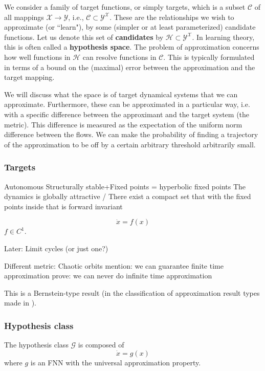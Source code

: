 \documentclass{article}
\theoremstyle{definition}
\theoremstyle{remark}
\begin{document}
We consider a family of target functions, or simply targets, which is a subset \(\mathcal{C} \) of all mappings \( \mathcal{X} \rightarrow \mathcal{Y} \), i.e., \( \mathcal{C} \subset \mathcal{Y}^\mathcal{X} \). 
These are the relationships we wish to approximate (or ``learn"), by some (simpler or at least parameterized) candidate functions.
Let us denote this set of \textbf{candidates} by \( \mathcal{H} \subset \mathcal{Y}^\mathcal{X} \).
In learning theory, this is often called a \textbf{hypothesis space}.
The problem of approximation concerns how well functions in \( \mathcal{H} \) can resolve functions in \( \mathcal{C} \).
This is typically formulated in terms of a bound on the (maximal) error between the approximation and the target mapping.

We will discuss what the space is of target dynamical systems that we can approximate.
Furthermore, these can be approximated in a particular way, i.e. with a specific difference between the approximant and the target system (the metric).
This difference is measured as the expectation of the uniform norm difference between the flows. 
We can make the probability of finding a trajectory of the approximation to be off by a certain arbitrary threshold arbitrarily small. 


\subsubsection{Targets}
Autonomous
Structurally stable+Fixed points = hyperbolic fixed points
The dynamics is globally attractive / There exist a compact set that with the fixed points inside that is forward invariant 

\begin{equation}
\dot x = f(x)
\end{equation}
$f\in C^1$.



Later: Limit cycles (or just one?)



Different metric: Chaotic orbits
mention: we can guarantee finite time approximation
prove: we can never do infinite time approximation 


This is a Bernstein-type result (in the classification of approximation result types made in \citep{jiang2023brief}).

\subsubsection{Hypothesis class}
The hypothesis class $\mathcal{G}$ is composed of
\begin{equation}
\dot x = g(x) 
\end{equation}
where $g$ is an FNN with the universal approximation property.
\end{document}
